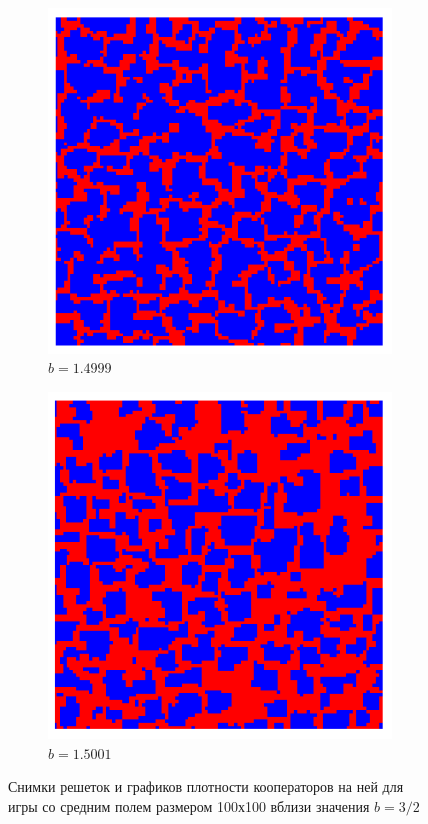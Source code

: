 \documentclass[a4paper]{article}
\begin{document}
\begin{figure}[H]
		\begin{subfigure}{.5\textwidth}
			\includegraphics[width=1\linewidth]{g1.4999.png}
			\caption{$b=1.4999$}
			\label{newg_left}			
		\end{subfigure}%
		\begin{subfigure}{.5\textwidth}
			\includegraphics[width=1\linewidth]{g1.5001.png}
			\caption{$b=1.5001$}
			\label{newg_right}						
		\end{subfigure}%
		\caption{Снимки решеток и графиков плотности кооператоров на ней для игры со средним полем размером 100х100 вблизи значения $b=3/2$}
		\label{new_exmpl}
	\end{figure}
\end{document}
